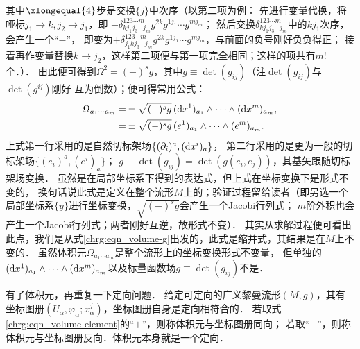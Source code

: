 其中$\xlongequal{4}$步是交换$\{j\}$中次序（以第二项为例：
先进行变量代换，将哑标$j_1 \to k, j_2\to j_1$，即
$-\delta_{k j_1 j_3 \cdots j_m}^{1 2 3\cdots m}g^{2 k}g^{1 j_1} \cdots g^{m j_m}$；
然后交换$\delta_{k j_1 j_3\cdots j_m}^{12 3\cdots m}$中的$k j_1$次序，会产生一个“$-$”，
即变为$+\delta_{j_1 kj_3\cdots j_m}^{12 3\cdots m}g^{2 k}g^{1 j_1} \cdots g^{m j_m}$，与前面的负号刚好负负得正；
接着再作变量替换$k \to j_2$，这样第二项便与第一项完全相同；这样的项共有$m!$个．）．
由此便可得到$\Omega^2=(-)^s g$，其中$g\equiv \det(g_{ij})$（注$\det(g_{ij})$与$\det(g^{ij})$刚好
互为倒数）；便可得常用公式：
\begin{subequations}\label{chrg:eqn_volume-element}
	\begin{align}
    \Omega_{a_1 \cdots a_m}=& \pm \sqrt{(-)^s g}\, ({\rm d}x^1)_{a_1} \wedge \cdots \wedge({\rm d}x^m)_{a_m}, \\
    =& \pm \sqrt{(-)^s g}\, (e^1)_{a_1} \wedge \cdots \wedge(e^m)_{a_m}.
    \end{align}
\end{subequations}
上式第一行采用的是自然切标架场$\{(\partial_i)^a,({\rm d}x^i)_a\}$，
第二行采用的是更为一般的切标架场$\{(e_i)^a,(e^i)_a\}$；
$g\equiv \det(g_{ij}) = \det (g(e_i,e_j))$，其基矢跟随切标架场变换．
虽然是在局部坐标系下得到的表达式，但上式在坐标变换下是形式不变的，
换句话说此式是定义在整个流形$M$上的；验证过程留给读者（即另选一个
局部坐标系$\{y\}$进行坐标变换，$\sqrt{(-)^s g}$会产生一个Jacobi行列式；
$m$阶外积也会产生一个Jacobi行列式；两者刚好互逆，故形式不变）．
其实从求解过程便可看出
此点，我们是从式\eqref{chrg:eqn_volume-g}出发的，此式是缩并式，其结果是在$M$上不变的．
虽然体积元$\Omega_{a_1 \cdots a_m}$是整个流形上的坐标变换形式不变量，
但单独的$({\rm d}x^1)_{a_1} \wedge \cdots \wedge({\rm d}x^m)_{a_m}$以及标量函数场$g\equiv \det(g_{ij})$不是．



有了体积元，再重复一下定向问题．  %
给定可定向的广义黎曼流形$(M,g)$，其有
坐标图册$(U_\alpha,\varphi_\alpha;x^j_\alpha)$，坐标图册自身是定向相符合的．
若取式\eqref{chrg:eqn_volume-element}的“$+$”，则称体积元与坐标图册同向；
若取“$-$”，则称体积元与坐标图册反向．体积元本身就是一个定向．




